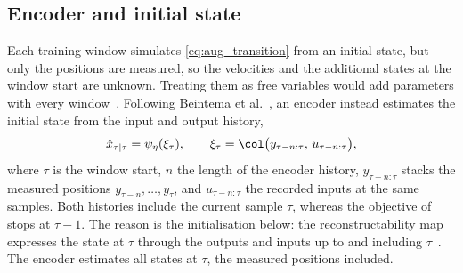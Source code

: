 \subsection{Encoder and initial state}\label{sec:aug_encoder}
Each training window simulates \eqref{eq:aug_transition} from an initial
state, but only the positions are measured, so the velocities and the
additional states at the window start are unknown.
Treating them as free variables would add parameters with every
window~\cite[Sec.~1]{hoekstra2026encoder}.
Following Beintema et al.~\cite{beintema2023subnet}, an encoder instead
estimates the initial state from the input and output history,
\begin{equation}
 \hat x_{\tau|\tau}
 =\psi_\eta(\xi_\tau),\qquad
 \xi_\tau=\col\bigl(y_{\tau-n:\tau},\,u_{\tau-n:\tau}\bigr),
 \label{eq:aug_encoder}
\end{equation}
where $\tau$ is the window start, $n$ the length of the encoder history,
$y_{\tau-n:\tau}$ stacks the measured positions $y_{\tau-n},\dots,y_\tau$,
and $u_{\tau-n:\tau}$ the recorded inputs at the same samples.
Both histories include the current sample $\tau$, whereas the objective
of~\cite[Eq.~(22e)]{hoekstra2026lfr} stops at $\tau-1$.
The reason is the initialisation below: the reconstructability map expresses
the state at $\tau$ through the outputs and inputs up to and including
$\tau$~\cite[Eq.~(15)]{hoekstra2026encoder}.
The encoder estimates all states at $\tau$, the measured positions included.

